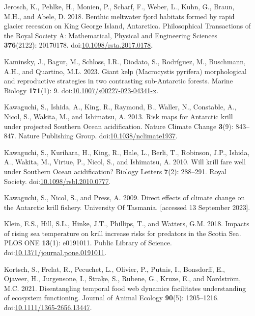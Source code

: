 \documentclass[
]{article}
\newlength{\cslhangindent}
\newenvironment{CSLReferences}[2] %
 {\begin{list}{}{%
  \setlength{\itemindent}{0pt}
  \setlength{\leftmargin}{0pt}
  \setlength{\parsep}{0pt}
  \ifodd #1
   \setlength{\leftmargin}{\cslhangindent}
   \setlength{\itemindent}{-1\cslhangindent}
  \fi
  \setlength{\itemsep}{#2\baselineskip}}}
 {\end{list}}
\begin{document}
\begin{CSLReferences}{1}{0}
Jerosch, K., Pehlke, H., Monien, P., Scharf, F., Weber, L., Kuhn, G.,
Braun, M.H., and Abele, D. 2018. Benthic meltwater fjord habitats formed
by rapid glacier recession on {King George Island}, {Antarctica}.
Philosophical Transactions of the Royal Society A: Mathematical,
Physical and Engineering Sciences \textbf{376}(2122): 20170178.
doi:\href{https://doi.org/10.1098/rsta.2017.0178}{10.1098/rsta.2017.0178}.

Kaminsky, J., Bagur, M., Schloss, I.R., Diodato, S., Rodríguez, M.,
Buschmann, A.H., and Quartino, M.L. 2023. Giant kelp ({Macrocystis}
pyrifera) morphological and reproductive strategies in two contrasting
sub-{Antarctic} forests. Marine Biology \textbf{171}(1): 9.
doi:\href{https://doi.org/10.1007/s00227-023-04341-x}{10.1007/s00227-023-04341-x}.

Kawaguchi, S., Ishida, A., King, R., Raymond, B., Waller, N., Constable,
A., Nicol, S., Wakita, M., and Ishimatsu, A. 2013. Risk maps for
{Antarctic} krill under projected {Southern Ocean} acidification. Nature
Climate Change \textbf{3}(9): 843--847. Nature Publishing Group.
doi:\href{https://doi.org/10.1038/nclimate1937}{10.1038/nclimate1937}.

Kawaguchi, S., Kurihara, H., King, R., Hale, L., Berli, T., Robinson,
J.P., Ishida, A., Wakita, M., Virtue, P., Nicol, S., and Ishimatsu, A.
2010. Will krill fare well under {Southern Ocean} acidification? Biology
Letters \textbf{7}(2): 288--291. Royal Society.
doi:\href{https://doi.org/10.1098/rsbl.2010.0777}{10.1098/rsbl.2010.0777}.

Kawaguchi, S., Nicol, S., and Press, A. 2009. Direct effects of climate
change on the {Antarctic} krill fishery. University Of Tasmania.
{[}accessed 13 September 2023{]}.

Klein, E.S., Hill, S.L., Hinke, J.T., Phillips, T., and Watters, G.M.
2018. Impacts of rising sea temperature on krill increase risks for
predators in the {Scotia Sea}. PLOS ONE \textbf{13}(1): e0191011. Public
Library of Science.
doi:\href{https://doi.org/10.1371/journal.pone.0191011}{10.1371/journal.pone.0191011}.

Kortsch, S., Frelat, R., Pecuchet, L., Olivier, P., Putnis, I.,
Bonsdorff, E., Ojaveer, H., Jurgensone, I., Strāķe, S., Rubene, G.,
Krūze, Ē., and Nordström, M.C. 2021. Disentangling temporal food web
dynamics facilitates understanding of ecosystem functioning. Journal of
Animal Ecology \textbf{90}(5): 1205--1216.
doi:\href{https://doi.org/10.1111/1365-2656.13447}{10.1111/1365-2656.13447}.


\end{CSLReferences}
\end{document}
